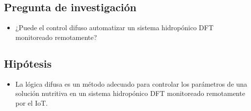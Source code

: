 \subsection{Pregunta de investigación}
\begin{itemize}
\item ¿Puede el control difuso automatizar un sistema hidropónico DFT monitoreado remotamente?
\end{itemize}
\subsection{Hipótesis}
\begin{itemize}
\item La lógica difusa es un método adecuado para controlar los parámetros de una solución nutritiva en un sistema hidropónico DFT monitoreado remotamente por el IoT.
\end{itemize}





  

